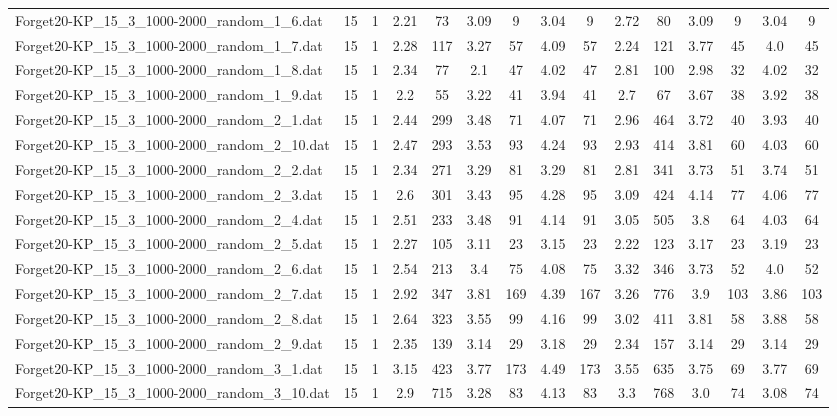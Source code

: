 \begin{table}[!ht]
{\begin{tabular}{lcccccccccccccc}
Forget20-KP\_15\_3\_1000-2000\_random\_1\_6.dat & 15 & 1 & 2.21 & 73 & 3.09 & 9 & 3.04 & 9 & 2.72 & 80 & 3.09 & 9 & 3.04 & 9 \\
Forget20-KP\_15\_3\_1000-2000\_random\_1\_7.dat & 15 & 1 & 2.28 & 117 & 3.27 & 57 & 4.09 & 57 & 2.24 & 121 & 3.77 & 45 & 4.0 & 45 \\
Forget20-KP\_15\_3\_1000-2000\_random\_1\_8.dat & 15 & 1 & 2.34 & 77 & 2.1 & 47 & 4.02 & 47 & 2.81 & 100 & 2.98 & 32 & 4.02 & 32 \\
Forget20-KP\_15\_3\_1000-2000\_random\_1\_9.dat & 15 & 1 & 2.2 & 55 & 3.22 & 41 & 3.94 & 41 & 2.7 & 67 & 3.67 & 38 & 3.92 & 38 \\
Forget20-KP\_15\_3\_1000-2000\_random\_2\_1.dat & 15 & 1 & 2.44 & 299 & 3.48 & 71 & 4.07 & 71 & 2.96 & 464 & 3.72 & 40 & 3.93 & 40 \\
Forget20-KP\_15\_3\_1000-2000\_random\_2\_10.dat & 15 & 1 & 2.47 & 293 & 3.53 & 93 & 4.24 & 93 & 2.93 & 414 & 3.81 & 60 & 4.03 & 60 \\
Forget20-KP\_15\_3\_1000-2000\_random\_2\_2.dat & 15 & 1 & 2.34 & 271 & 3.29 & 81 & 3.29 & 81 & 2.81 & 341 & 3.73 & 51 & 3.74 & 51 \\
Forget20-KP\_15\_3\_1000-2000\_random\_2\_3.dat & 15 & 1 & 2.6 & 301 & 3.43 & 95 & 4.28 & 95 & 3.09 & 424 & 4.14 & 77 & 4.06 & 77 \\
Forget20-KP\_15\_3\_1000-2000\_random\_2\_4.dat & 15 & 1 & 2.51 & 233 & 3.48 & 91 & 4.14 & 91 & 3.05 & 505 & 3.8 & 64 & 4.03 & 64 \\
Forget20-KP\_15\_3\_1000-2000\_random\_2\_5.dat & 15 & 1 & 2.27 & 105 & 3.11 & 23 & 3.15 & 23 & 2.22 & 123 & 3.17 & 23 & 3.19 & 23 \\
Forget20-KP\_15\_3\_1000-2000\_random\_2\_6.dat & 15 & 1 & 2.54 & 213 & 3.4 & 75 & 4.08 & 75 & 3.32 & 346 & 3.73 & 52 & 4.0 & 52 \\
Forget20-KP\_15\_3\_1000-2000\_random\_2\_7.dat & 15 & 1 & 2.92 & 347 & 3.81 & 169 & 4.39 & 167 & 3.26 & 776 & 3.9 & 103 & 3.86 & 103 \\
Forget20-KP\_15\_3\_1000-2000\_random\_2\_8.dat & 15 & 1 & 2.64 & 323 & 3.55 & 99 & 4.16 & 99 & 3.02 & 411 & 3.81 & 58 & 3.88 & 58 \\
Forget20-KP\_15\_3\_1000-2000\_random\_2\_9.dat & 15 & 1 & 2.35 & 139 & 3.14 & 29 & 3.18 & 29 & 2.34 & 157 & 3.14 & 29 & 3.14 & 29 \\
Forget20-KP\_15\_3\_1000-2000\_random\_3\_1.dat & 15 & 1 & 3.15 & 423 & 3.77 & 173 & 4.49 & 173 & 3.55 & 635 & 3.75 & 69 & 3.77 & 69 \\
Forget20-KP\_15\_3\_1000-2000\_random\_3\_10.dat & 15 & 1 & 2.9 & 715 & 3.28 & 83 & 4.13 & 83 & 3.3 & 768 & 3.0 & 74 & 3.08 & 74 \\

\end{tabular}}
\end{table}
